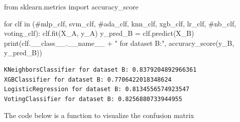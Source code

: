 \documentclass[
  letterpaper,
  DIV=11,
  numbers=noendperiod]{scrartcl}
\newenvironment{Shaded}{\begin{snugshade}}{\end{snugshade}}
\newcommand{\BuiltInTok}[1]{\textcolor[rgb]{0.00,0.23,0.31}{#1}}
\newcommand{\CommentTok}[1]{\textcolor[rgb]{0.37,0.37,0.37}{#1}}
\newcommand{\ControlFlowTok}[1]{\textcolor[rgb]{0.00,0.23,0.31}{#1}}
\newcommand{\ImportTok}[1]{\textcolor[rgb]{0.00,0.46,0.62}{#1}}
\newcommand{\KeywordTok}[1]{\textcolor[rgb]{0.00,0.23,0.31}{#1}}
\newcommand{\NormalTok}[1]{\textcolor[rgb]{0.00,0.23,0.31}{#1}}
\newcommand{\OperatorTok}[1]{\textcolor[rgb]{0.37,0.37,0.37}{#1}}
\newcommand{\StringTok}[1]{\textcolor[rgb]{0.13,0.47,0.30}{#1}}
\newcommand{\VariableTok}[1]{\textcolor[rgb]{0.07,0.07,0.07}{#1}}
\begin{document}
\begin{Shaded}
\begin{Highlighting}[]
\ImportTok{from}\NormalTok{ sklearn.metrics }\ImportTok{import}\NormalTok{ accuracy\_score}

\ControlFlowTok{for}\NormalTok{ clf }\KeywordTok{in}\NormalTok{ (}\CommentTok{\#mlp\_clf, svm\_clf, \#ada\_clf,}
\NormalTok{            knn\_clf, xgb\_clf, lr\_clf, }\CommentTok{\#nb\_clf,}
\NormalTok{            voting\_clf):}
\NormalTok{    clf.fit(X\_A, y\_A)}
\NormalTok{    y\_pred\_B }\OperatorTok{=}\NormalTok{ clf.predict(X\_B)}
    \BuiltInTok{print}\NormalTok{(clf.\_\_class\_\_.}\VariableTok{\_\_name\_\_} \OperatorTok{+} \StringTok{" for dataset B:"}\NormalTok{, accuracy\_score(y\_B, y\_pred\_B))}
\end{Highlighting}
\end{Shaded}

\begin{verbatim}
KNeighborsClassifier for dataset B: 0.8379204892966361
XGBClassifier for dataset B: 0.7706422018348624
LogisticRegression for dataset B: 0.8134556574923547
VotingClassifier for dataset B: 0.8256880733944955
\end{verbatim}

The code below is a function to visualize the confusion matrix
\end{document}

